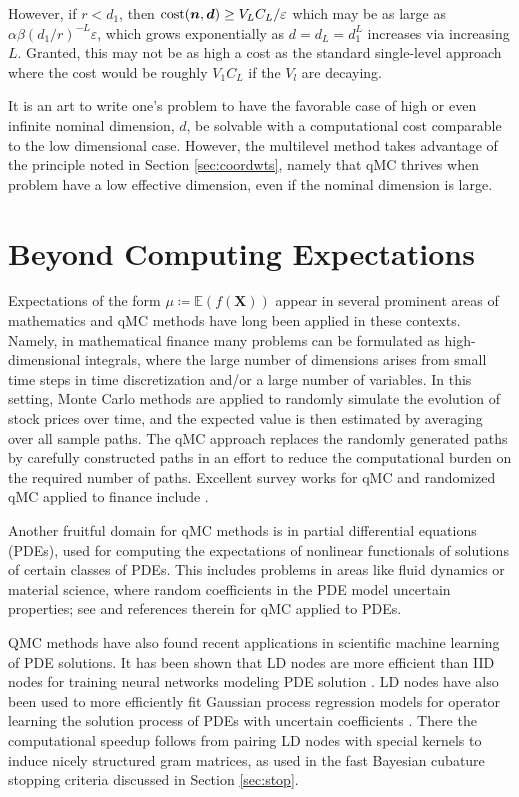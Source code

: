 \documentclass{svproc}
\begin{document}
However, if $r < d_1$, then $\text{cost}({\boldsymbol{n}},{\boldsymbol{d}}) \ge V_LC_L/\varepsilon$ which may be as large as $\alpha \beta (d_1/r)^{-L}{\varepsilon}$, which grows exponentially as $d = d_L = d_1^L$ increases via increasing $L$.  Granted, this may not be as high a cost as the standard single-level approach where the cost would be roughly $V_1C_L$ if the $V_l$ are decaying.

It is an art to write one's problem to have the favorable case of high or even infinite nominal dimension, $d$, be solvable with a computational cost comparable to the low dimensional case.  However, the multilevel method takes advantage of the principle noted in Section \ref{sec:coordwts}, namely that qMC thrives when problem have a low effective dimension, even if the nominal dimension is large.  

\section{Beyond Computing Expectations} \label{sec:beyond}

Expectations of the form $\mu \coloneqq \mathbb{E}(f(\mathbf{X}))$ appear in several prominent areas of mathematics and qMC methods have long been applied in these contexts. Namely, in mathematical finance many problems can be formulated as high-dimensional integrals, where the large number of dimensions arises from small time steps in time discretization and/or a large number of variables. In this setting, Monte Carlo methods are applied to randomly simulate the evolution of stock prices over time, and the expected value is then estimated by averaging over all sample paths. The qMC approach replaces the randomly generated paths by carefully constructed paths in an effort to reduce the computational burden on the required number of paths. Excellent survey works for qMC and randomized qMC applied to finance include \cite{CafMor96,LEc09,Lem04a,Jae02,wangsloan05}. 

Another fruitful domain for qMC methods is in partial differential equations (PDEs), used for computing the expectations of nonlinear functionals of solutions of certain classes of PDEs. This includes problems in areas like fluid dynamics or material science, where random coefficients in the PDE model uncertain properties; see \cite{KuoNuy16a,KuoEtal12a,GraEtal11a} and references therein for qMC applied to PDEs.

QMC methods have also found recent applications in scientific machine learning of PDE solutions. It has been shown that LD nodes are more efficient than IID nodes for training neural networks modeling PDE solution \cite{longo21,mishra21}. LD nodes have also been used to more efficiently fit Gaussian process regression models for operator learning the solution process of PDEs with uncertain coefficients  \cite{sorokin2024computationally}. There the computational speedup follows from pairing LD nodes with special kernels to induce nicely structured gram matrices, as used in the fast Bayesian cubature stopping criteria discussed in Section \ref{sec:stop}. 
\end{document}
